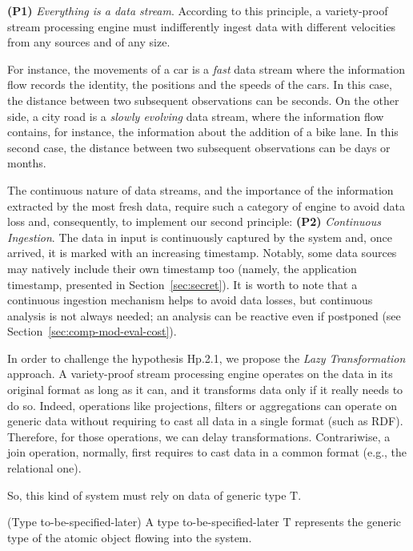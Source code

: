 \textbf{(P1)} \textit{Everything is a data stream}. According to this principle, a variety-proof stream processing engine must indifferently ingest data with different velocities from any sources and of any size. 

For instance, the movements of a car is a \textit{fast} data stream where the information flow records the identity, the positions and the speeds of the cars. In this case, the distance between two subsequent observations can be seconds. On the other side, a city road is a \textit{slowly evolving} data stream, where the information flow contains, for instance, the information about the addition of a bike lane.
In this second case, the distance between two subsequent observations can be days or months. 

The continuous nature of data streams, and the importance of the information extracted by the most fresh data, require such a category of engine to avoid data loss and, consequently, to implement our second principle: \textbf{(P2)} \textit{Continuous Ingestion}. The data in input is continuously captured by the system and, once arrived, it is marked with an increasing timestamp. Notably, some data sources may natively include their own timestamp too (namely, the application timestamp, presented in Section~\ref{sec:secret}). It is worth to note that a continuous ingestion mechanism helps to avoid data losses, but continuous analysis is not always needed; an analysis can be reactive even if postponed (see Section~\ref{sec:comp-mod-eval-cost}).

In order to challenge the hypothesis \textsf{Hp.2.1}, we propose the \textit{Lazy Transformation} approach. 
A variety-proof stream processing engine operates on the data in its original format as long as it can, and it transforms data only if it really needs to do so. Indeed, operations like projections, filters or aggregations can operate on generic data without requiring to cast all data in a single format (such as RDF). Therefore, for those operations, we can delay transformations. Contrariwise, a join operation, normally, first requires to cast data in a common format (e.g., the relational one). 

So, this kind of system must rely on data of generic type $\mathrm{T}$.

\begin{Definition}
(Type to-be-specified-later) A type to-be-specified-later $\mathrm{T}$ represents the generic type of the atomic object flowing into the system.
\end{Definition}

